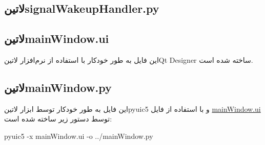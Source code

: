 \subsection*{‌لاتین{signalWakeupHandler.py}}
\begin{latin}
	
\end{latin}

\subsection*{‌لاتین{mainWindow.ui}}\label{mainWindow.ui}
این فایل به طور خودکار با استفاده از نرم‌افزار ‌لاتین{Qt Designer} ساخته شده است.
\begin{latin}
	
\end{latin}

\subsection*{‌لاتین{mainWindow.py}}
این فایل به طور خودکار توسط ابزار ‌لاتین{pyuic5} و با استفاده از فایل
\hyperref[mainWindow.ui]{mainWindow.ui}
توسط دستور زیر ساخته شده است: 
\begin{latin}
	pyuic5 -x mainWindow.ui -o ../mainWindow.py
	
\end{latin}


